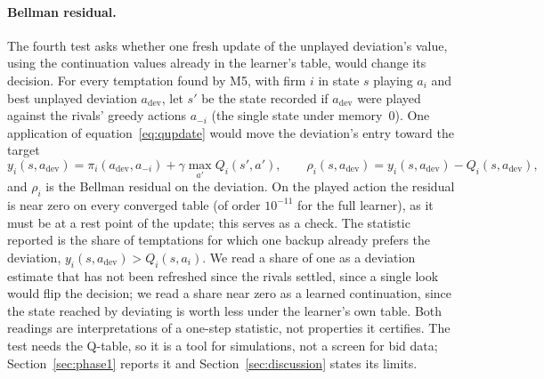 \paragraph{Bellman residual.} The fourth test asks whether one fresh update of the unplayed deviation's value, using the continuation values already in the learner's table, would change its decision. For every temptation found by M5, with firm $i$ in state $s$ playing $a_i$ and best unplayed deviation $a_{\mathrm{dev}}$, let $s'$ be the state recorded if $a_{\mathrm{dev}}$ were played against the rivals' greedy actions $a_{-i}$ (the single state under memory~0). One application of equation~\eqref{eq:qupdate} would move the deviation's entry toward the target
\begin{equation}
y_i(s, a_{\mathrm{dev}}) = \pi_i(a_{\mathrm{dev}}, a_{-i}) + \gamma \max_{a'} Q_i(s', a'),
\qquad
\rho_i(s, a_{\mathrm{dev}}) = y_i(s, a_{\mathrm{dev}}) - Q_i(s, a_{\mathrm{dev}}),
\end{equation}
and $\rho_i$ is the Bellman residual on the deviation. On the played action the residual is near zero on every converged table (of order $10^{-11}$ for the full learner), as it must be at a rest point of the update; this serves as a check. The statistic reported is the share of temptations for which one backup already prefers the deviation, $y_i(s, a_{\mathrm{dev}}) > Q_i(s, a_i)$. We read a share of one as a deviation estimate that has not been refreshed since the rivals settled, since a single look would flip the decision; we read a share near zero as a learned continuation, since the state reached by deviating is worth less under the learner's own table. Both readings are interpretations of a one-step statistic, not properties it certifies. The test needs the Q-table, so it is a tool for simulations, not a screen for bid data; Section~\ref{sec:phase1} reports it and Section~\ref{sec:discussion} states its limits.
